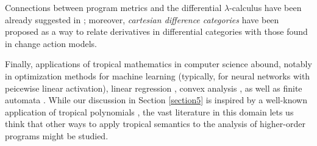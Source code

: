 Connections between program metrics and the differential $\lambda$-calculus have been already suggested in \cite{}; moreover, \emph{cartesian difference categories} \cite{} have been proposed as a way to relate derivatives in differential categories with those found in change action models.



Finally, applications of tropical mathematics in computer science abound, notably in optimization methods for machine learning \cite{} (typically, for neural networks with peicewise linear activation), linear regression \cite{}, convex analysis \cite{}, as well as finite automata \cite{}.
While our discussion in Section \ref{section5} is inspired by a well-known application of tropical polynomials \cite{},  
the vast literature in this domain lets us think that other ways to 
apply tropical semantics to the analysis of higher-order programs might be studied.

%
%
%
 










